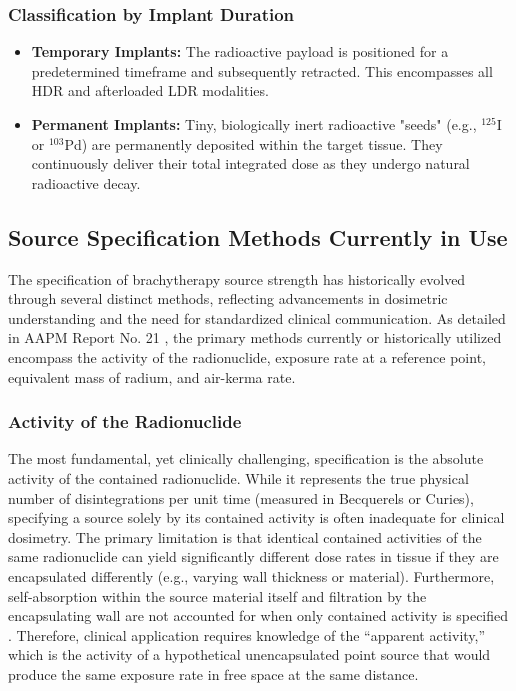 \subsubsection{Classification by Implant Duration}
\begin{itemize}
    \item \textbf{Temporary Implants:} The radioactive payload is positioned for a predetermined timeframe and subsequently retracted. This encompasses all HDR and afterloaded LDR modalities.
    \item \textbf{Permanent Implants:} Tiny, biologically inert radioactive "seeds" (e.g., $^{125}$I or $^{103}$Pd) are permanently deposited within the target tissue. They continuously deliver their total integrated dose as they undergo natural radioactive decay.
\end{itemize}

\subsection{Source Specification Methods Currently in Use}
The specification of brachytherapy source strength has historically evolved through several distinct methods, reflecting advancements in dosimetric understanding and the need for standardized clinical communication. As detailed in AAPM Report No. 21 \cite{aapm1987report21}, the primary methods currently or historically utilized encompass the activity of the radionuclide, exposure rate at a reference point, equivalent mass of radium, and air-kerma rate.

\subsubsection{Activity of the Radionuclide}
The most fundamental, yet clinically challenging, specification is the absolute activity of the contained radionuclide. While it represents the true physical number of disintegrations per unit time (measured in Becquerels or Curies), specifying a source solely by its contained activity is often inadequate for clinical dosimetry. The primary limitation is that identical contained activities of the same radionuclide can yield significantly different dose rates in tissue if they are encapsulated differently (e.g., varying wall thickness or material). Furthermore, self-absorption within the source material itself and filtration by the encapsulating wall are not accounted for when only contained activity is specified \cite{aapm1987report21}. Therefore, clinical application requires knowledge of the ``apparent activity,'' which is the activity of a hypothetical unencapsulated point source that would produce the same exposure rate in free space at the same distance.

